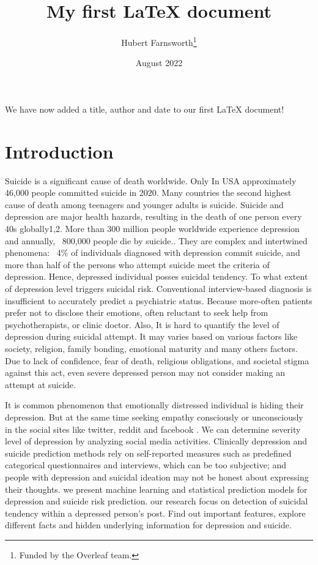 \documentclass[12pt, letterpaper]{article}
\title{My first LaTeX document}
\author{Hubert Farnsworth\thanks{Funded by the Overleaf team.}}
\date{August 2022}
\begin{document}
\maketitle
We have now added a title, author and date to our first \LaTeX{} document!\cite{chen2018}


\section{Introduction}\label{sec1}
Suicide is a significant cause of death worldwide. Only In USA approximately 46,000 people committed suicide in 2020. Many countries the second highest cause of death among teenagers and younger adults is suicide. Suicide and depression are major health hazards, resulting in the death of one person every 40s globally1,2. More than 300 million people worldwide experience depression and annually, ~800,000 people die by suicide.. They are complex and intertwined phenomena: ~4\% of individuals diagnosed with depression commit suicide, and more than half of the persons who attempt suicide meet the criteria of depression. Hence, depressed individual posses suicidal tendency. To what extent of depression level triggers suicidal risk. Conventional interview-based diagnosis is insufficient to accurately predict a psychiatric status. Because more-often patients prefer not to disclose their emotions, often reluctant to seek help from psychotherapists, or clinic doctor. Also, It is hard to quantify the level of depression during suicidal attempt. It may varies based on various factors like society, religion, family bonding, emotional maturity and many others factors. Due to lack of confidence, fear of death, religious obligations, and societal stigma against this act, even severe depressed person may not consider making an attempt at suicide.

 

It is common phenomenon that emotionally distressed individual is hiding their depression. But at the same time seeking empathy consciously or unconsciously in the social sites like twitter, reddit and facebook \cite{chen2018, park2013perception, de2013predicting, xu2016contribution, burnap2015machine}. We can determine severity level of depression by analyzing social media activities. Clinically depression and suicide prediction methods rely on self-reported measures such as predefined categorical questionnaires and interviews, which can be too subjective; and people with depression and suicidal ideation may not be honest about expressing their thoughts. we present machine learning and statistical prediction models for depression and suicide risk prediction. our research focus on detection of suicidal tendency within a depressed person’s post. Find out important features, explore different facts and hidden underlying information for depression and suicide.  
\end{document}
